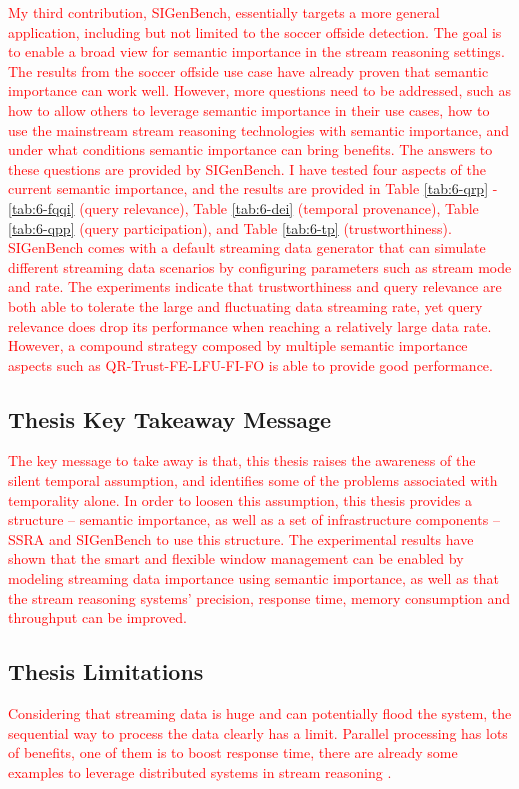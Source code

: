 \textcolor{red}{
My third contribution, SIGenBench, essentially targets a more general application, including but not limited to the soccer offside detection. 
The goal is to enable a broad view for semantic importance in the stream reasoning settings. 
The results from the soccer offside use case have already proven that semantic importance can work well. 
However, more questions need to be addressed, such as how to allow others to leverage semantic importance in their use cases, how to use the mainstream stream reasoning technologies with semantic importance, and under what conditions semantic importance can bring benefits. 
The answers to these questions are provided by SIGenBench. 
I have tested four aspects of the current semantic importance, and the results are provided in Table \ref{tab:6-qrp} - \ref{tab:6-fqqi} (query relevance), Table \ref{tab:6-dei} (temporal provenance), Table \ref{tab:6-qpp} (query participation), and Table \ref{tab:6-tp} (trustworthiness). 
SIGenBench comes with a default streaming data generator that can simulate different streaming data scenarios by configuring parameters such as stream mode and rate. 
The experiments indicate that trustworthiness and query relevance are both able to tolerate the large and fluctuating data streaming rate, yet query relevance does drop its performance when reaching a relatively large data rate. 
However, a compound strategy composed by multiple semantic importance aspects such as QR-Trust-FE-LFU-FI-FO is able to provide good performance.
}
%
\subsection{Thesis Key Takeaway Message}
\textcolor{red}{
The key message to take away is that, this thesis raises the awareness of the silent temporal assumption, and identifies some of the problems associated with temporality alone.
In order to loosen this assumption, this thesis provides a structure -- semantic importance, as well as a set of infrastructure components -- SSRA and SIGenBench to use this structure. 
The experimental results have shown that the smart and flexible window management can be enabled by modeling streaming data importance using semantic importance, as well as that the stream reasoning systems' precision, response time, memory consumption and throughput can be improved.
}
%
\subsection{Thesis Limitations}
\textcolor{red}{
Considering that streaming data is huge and can potentially flood the system, the sequential way to process the data clearly has a limit. 
Parallel processing has lots of benefits, one of them is to boost response time, there are already some examples to leverage distributed systems in stream reasoning \cite{hoeksema2011high} \cite{liu2014efficient}. 
}

